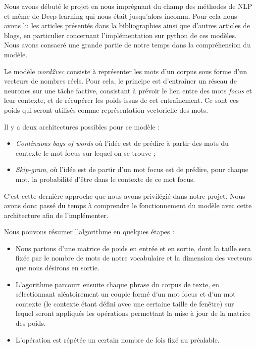 \documentclass[11pt,french,french]{article}
\begin{document}
Nous avons débuté le projet en nous imprégnant du champ des méthodes de
NLP et même de Deep-learning qui nous était jusqu'alors inconnu. Pour
cela nous avons lu les articles présentés dans la bibliographies ainsi
que d'autres articles de blogs, en particulier concernant
l'implémentation sur python de ces modèles. Nous avons consacré une
grande partie de notre temps dans la compréhension du modèle.

Le modèle \emph{word2vec} consiste à représenter les mots d'un corpus
sous forme d'un vecteurs de nombres réels. Pour cela, le principe est
d'entraîner un réseau de neurones sur une tâche factive, consistant à
prévoir le lien entre des mots \emph{focus} et leur contexte, et de
récupérer les poids issus de cet entraînement. Ce sont ces poids qui
seront utilisés comme représentation vectorielle des mots.

Il y a deux architectures possibles pour ce modèle :

\begin{itemize}
\item  \textit{Continuous bags of words} où l'idée est de prédire à partir des mots du contexte le mot focus sur lequel on se trouve ;
\item \textit{Skip-gram}, où l'idée est de partir d'un mot focus est de prédire, pour chaque mot, la probabilité d'être dans le contexte de ce mot focus.
\end{itemize}

C'est cette dernière approche que nous avons privilégié dans notre
projet. Nous avons donc passé du temps à comprendre le fonctionnement du
modèle avec cette architecture afin de l'implémenter.

Nous pouvons résumer l'algorithme en quelques étapes :

\begin{itemize}
\item Nous partons d'une matrice de poids en entrée et en sortie, dont la taille sera fixée par le nombre de mots de notre vocabulaire et la dimension des vecteurs que nous désirons en sortie. 
\item L'agorithme parcourt ensuite chaque phrase du corpus de texte, en sélectionnant aléatoirement un couple formé d'un mot focus et d'un mot contexte (le contexte étant défini avec une certaine taille de fenêtre) sur lequel seront appliqués les opérations permettant la mise à jour de la matrice des poids.
\item L'opération est répétée un certain nombre de fois fixé au préalable.
\end{itemize}
\end{document}
